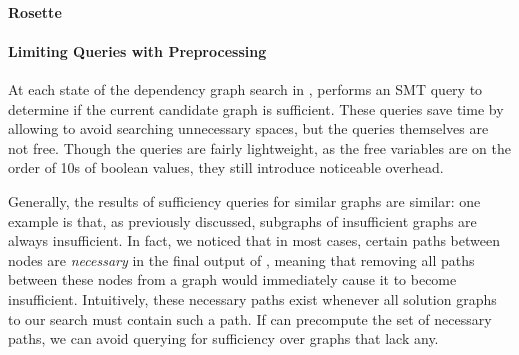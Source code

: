 %

\paragraph{Rosette}

\paragraph{Limiting Queries with Preprocessing}

At each state of the dependency graph search in \sccsearch, \depsynth
performs an SMT query to determine if the current candidate graph
is sufficient. These queries save time by allowing \sccsearch to avoid
searching unnecessary spaces, but the queries themselves are not free.
Though the queries are fairly lightweight, as the free variables are on
the order of 10s of boolean values, they still introduce noticeable overhead.

Generally, the results of sufficiency queries for similar graphs are similar:
one example is that, as previously discussed, subgraphs of insufficient graphs
are always insufficient.
In fact, we noticed that in most cases, certain paths between nodes are
\textit{necessary} in the final output of \sccsearch, meaning that
removing all paths between these nodes from a graph would immediately
cause it to become insufficient.
Intuitively, these necessary paths exist whenever all solution graphs
to our search must contain such a path.
If \depsynth can precompute the set of necessary paths,
we can avoid querying for sufficiency over graphs that lack any.

